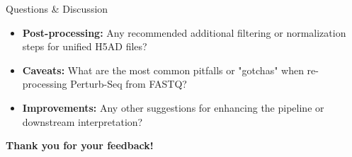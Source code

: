 \documentclass[handout]{beamer}
\begin{document}
\begin{frame}{Questions \& Discussion}
    \begin{itemize}
        \item \textbf{Post-processing:} Any recommended additional filtering or normalization steps for unified H5AD files?
        \item \textbf{Caveats:} What are the most common pitfalls or "gotchas" when re-processing Perturb-Seq from FASTQ?
        \item \textbf{Improvements:} Any other suggestions for enhancing the pipeline or downstream interpretation?
    \end{itemize}
    \vspace{2em}
    \centering
    \textbf{Thank you for your feedback!}
\end{frame}
\end{document}
